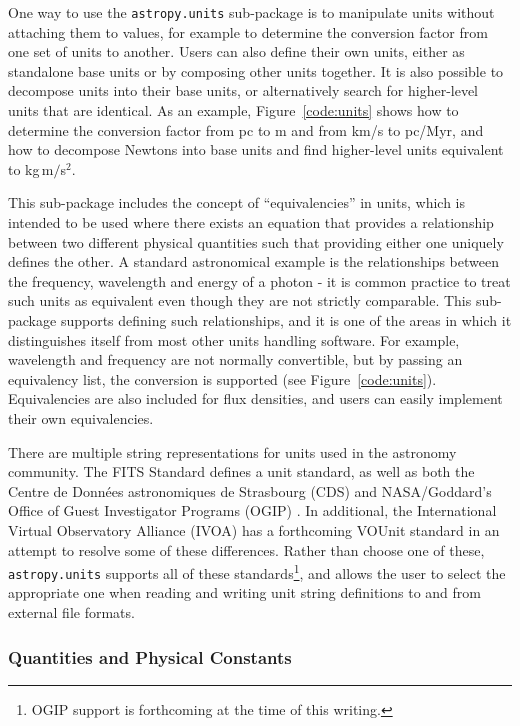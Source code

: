 \documentclass[traditabstract]{aa}
\begin{document}
\label{sec:units}

One way to use the \texttt{astropy.units} sub-package is to manipulate units
without attaching them to values, for example to determine the conversion
factor from one set of units to another. Users can also define their own
units, either as standalone base units or by composing other units together.
It is also possible to decompose units into their base units, or alternatively
search for higher-level units that are identical. As an example,
Figure~\ref{code:units} shows how to determine the conversion factor from pc
to m and from km/s to pc/Myr, and how to decompose Newtons into base units and
find higher-level units equivalent to kg\,m$/$s$^2$.

This sub-package includes the concept of ``equivalencies'' in units, which is
intended to be used where there exists an equation that provides a
relationship between two different physical quantities such that providing
either one uniquely defines the other. A standard astronomical example is the
relationships between the frequency, wavelength and energy of a photon - it is
common practice to treat such units as equivalent even though they are not
strictly comparable. This sub-package supports defining such relationships,
and it is one of the areas in which it distinguishes itself from most other units
handling software. For example, wavelength and frequency are not normally
convertible, but by passing an equivalency list, the conversion is supported
(see Figure~\ref{code:units}). Equivalencies are also included for flux
densities, and users can easily implement their own equivalencies.

There are multiple string representations for units used in the astronomy
community. The FITS Standard \cite{fits2008} defines a unit standard, as well
as both the Centre de Donn\'ees astronomiques de Strasbourg (CDS)
\citep{ochsenbein2000cds} and NASA/Goddard's Office of Guest Investigator
Programs (OGIP) \citep{george1995ogip}. In additional, the International
Virtual Observatory Alliance (IVOA) has a forthcoming VOUnit standard
\citep{derriere2012vounit} in an attempt to resolve some of these differences.
Rather than choose one of these, \texttt{astropy.units} supports all of these
standards\footnote{OGIP support is forthcoming at the time of this writing.},
and allows the user to select the appropriate one when reading and writing
unit string definitions to and from external file formats.

\subsubsection{Quantities and Physical Constants}
\end{document}

